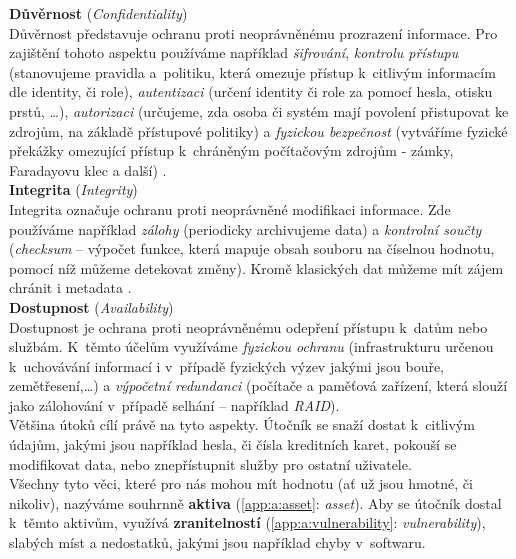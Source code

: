 \textbf{Důvěrnost} (\textit{Confidentiality}) \\
Důvěrnost představuje ochranu proti neoprávněnému prozrazení informace. Pro zajištění tohoto aspektu používáme například \textit{šifrování}, 
\textit{kontrolu přístupu} (stanovujeme pravidla a~politiku, která omezuje přístup k~citlivým informacím dle identity, či role), \textit{autentizaci} 
(určení identity či role za pomocí hesla, otisku prstů, \dots), \textit{autorizaci} (určujeme, zda osoba či systém mají povolení přistupovat 
ke zdrojům, na základě přístupové politiky) a \textit{fyzickou bezpečnost} (vytváříme fyzické překážky omezující přístup k~chráněným počítačovým 
zdrojům - zámky, Faradayovu klec a další) \cite[str. 4-5]{Goodrich2011}. \\

\textbf{Integrita} (\textit{Integrity}) \\
Integrita označuje ochranu proti neoprávněné modifikaci informace. Zde používáme například \textit{zálohy} (periodicky archivujeme data) 
a \textit{kontrolní součty} (\textit{checksum} -- výpočet funkce, která mapuje obsah souboru na číselnou hodnotu, pomocí níž můžeme detekovat změny). 
Kromě klasických dat můžeme mít zájem chránit i metadata \cite[str. 6-7]{Goodrich2011}. \\

\textbf{Dostupnost} (\textit{Availability}) \\
Dostupnost je ochrana proti neoprávněnému odepření přístupu k~datům nebo službám. K~těmto účelům využíváme 
\textit{fyzickou ochranu} (infrastrukturu určenou k~uchovávání informací i v~případě fyzických výzev jakými jsou bouře, zemětřesení,\dots) 
a \textit{výpočetní redundanci} (počítače a paměťová zařízení, která slouží jako zálohování 
v~případě selhání -- například \textit{RAID})\cite[str. 7]{Goodrich2011}. \\

Většina útoků cílí právě na tyto aspekty. Útočník se snaží dostat k~citlivým údajům, jakými jsou například hesla, či čísla kreditních karet, 
pokouší se modifikovat data, nebo znepřístupnit služby pro ostatní uživatele. \\

Všechny tyto věci, které pro nás mohou mít hodnotu (ať už jsou hmotné, či nikoliv), nazýváme souhrnně \textbf{aktiva} 
(\ref{app:a:asset}: \textit{asset}). Aby se útočník dostal k~těmto aktivům, využívá \textbf{zranitelností} 
(\ref{app:a:vulnerability}: \textit{vulnerability}), slabých míst a nedostatků, jakými jsou například chyby v~softwaru. 

